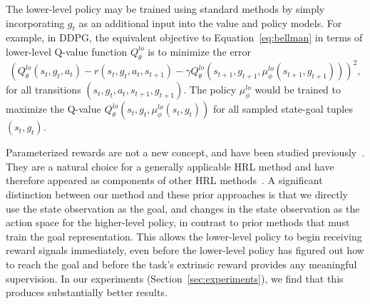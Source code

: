 \documentclass{article}
\begin{document}
The lower-level policy may be trained using standard methods by simply incorporating $g_t$ as an additional input into the value and policy models.
For example, in DDPG, the equivalent objective to Equation~\ref{eq:bellman} in terms of lower-level Q-value function $Q_\theta^{lo}$ is to minimize the error
\begin{equation}
(Q_\theta^{lo}(s_t, g_t, a_t) - r(s_t, g_t, a_t, s_{t+1}) - \gamma Q_\theta^{lo}(s_{t+1}, g_{t+1}, \mu_\phi^{lo}(s_{t+1}, g_{t+1})))^2,
\end{equation}
for all transitions $(s_t, g_t, a_t, s_{t+1}, g_{t+1})$.  The policy $\mu_\phi^{lo}$ would be trained to maximize the Q-value $Q_\theta^{lo}(s_t, g_t, \mu_\phi^{lo}(s_t, g_t))$
for all sampled state-goal tuples $(s_t, g_t)$.

Parameterized rewards are not a new concept, and have been studied previously~\cite{uvf,held2017automatic}.
They are a natural choice for a generally applicable HRL method and have therefore appeared 
as components of other HRL methods~\cite{vezhnevets2017feudal,kulkarni2016hierarchical,plappert2018multi,levy2017hierarchical}. A significant distinction between our method and these prior approaches is that we directly use the state observation as the goal, and changes in the state observation as the action space for the higher-level policy, in contrast to prior methods that must train the goal representation. This allows the lower-level policy to begin receiving reward signals immediately, even before the lower-level policy has figured out how to reach the goal and before the task's extrinsic reward provides any meaningful supervision. In our experiments (Section~\ref{sec:experiments}), we find that this produces substantially better results.

\end{document}
